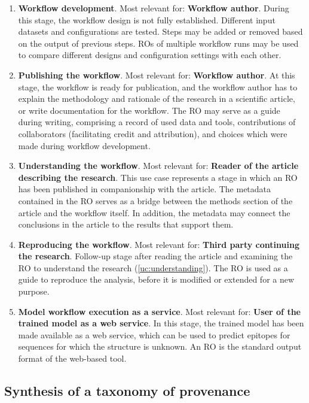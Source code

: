 \begin{enumerate}[label=\textbf{U\arabic*}]
    \item \textbf{Workflow development}. Most relevant for: \textbf{Workflow author}. During this stage, the workflow design is not fully established. Different input datasets and configurations are tested. Steps may be added or removed based on the output of previous steps. ROs of multiple workflow runs may be used to compare different designs and configuration settings with each other. \label{uc:wf_dev}
    \item \textbf{Publishing the workflow}. Most relevant for: \textbf{Workflow author}. At this stage, the workflow is ready for publication, and the workflow author has to explain the methodology and rationale of the research in a scientific article, or write documentation for the workflow. The RO may serve as a guide during writing, comprising a record of used data and tools, contributions of collaborators (facilitating credit and attribution), and choices which were made during workflow development. \label{uc:writing}
    \item \textbf{Understanding the workflow}. Most relevant for: \textbf{Reader of the article describing the research}. This use case represents a stage in which an RO has been published in companionship with the article. The metadata contained in the RO serves as a bridge between the methods section of the article and the workflow itself. In addition, the metadata may connect the conclusions in the article to the results that support them. \label{uc:understanding}
    \item \textbf{Reproducing the workflow}. Most relevant for: \textbf{Third party continuing the research}. Follow-up stage after reading the article and examining the RO to understand the research (\ref{uc:understanding}). The RO is used as a guide to reproduce the analysis, before it is modified or extended for a new purpose. \label{uc:reproducing}
    \item \textbf{Model workflow execution as a service}. Most relevant for: \textbf{User of the trained model as a web service}. In this stage, the trained model has been made available as a web service, which can be used to predict epitopes for sequences for which the structure is unknown. An RO is the standard output format of the web-based tool. \label{uc:service}
\end{enumerate}


\subsection{Synthesis of a taxonomy of provenance}


